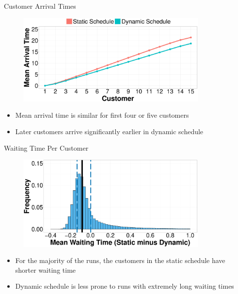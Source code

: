 \documentclass{beamer}
\begin{document}
\begin{frame}{Customer Arrival Times}
	\begin{figure}
		\centering
		\includegraphics[width=0.85\textwidth]{AT_Line.eps}
	\end{figure}

	\begin{itemize}
		\item Mean arrival time is similar for first four or five customers
		\item Later customers arrive significantly earlier in dynamic schedule
	\end{itemize}
\end{frame}

\begin{frame}{Waiting Time Per Customer}
	\begin{figure}
		\centering
		\includegraphics[width=0.85\textwidth]{WT_Hist_Diff.eps}
	\end{figure}

	\begin{itemize}
		\item For the majority of the runs, the customers in the static schedule have shorter waiting time
		\item Dynamic schedule is less prone to runs with extremely long waiting times
	\end{itemize}
\end{frame}
\end{document}
